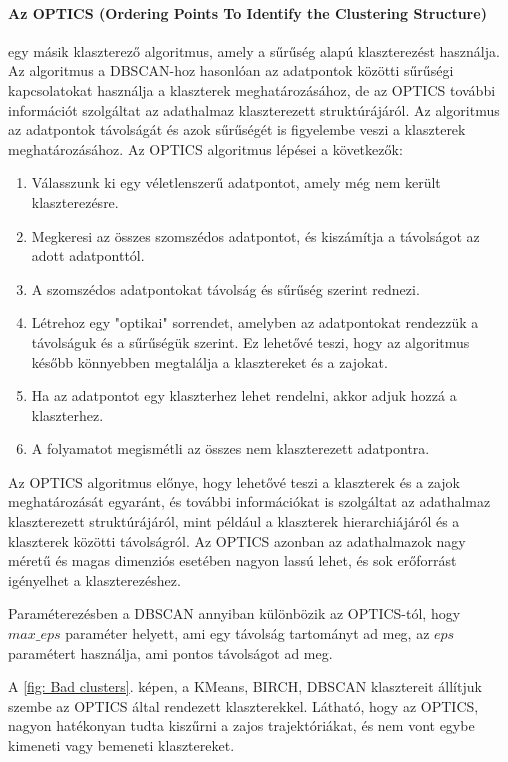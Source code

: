 \documentclass[acmtog, authorversion]{acmart}
\begin{document}
\paragraph{Az OPTICS (Ordering Points To Identify the Clustering Structure)} egy másik klaszterező algoritmus, amely a sűrűség alapú klaszterezést használja. Az algoritmus a DBSCAN-hoz hasonlóan az adatpontok közötti sűrűségi kapcsolatokat használja a klaszterek meghatározásához, de az OPTICS további információt szolgáltat az adathalmaz klaszterezett struktúrájáról. Az algoritmus az adatpontok távolságát és azok sűrűségét is figyelembe veszi a klaszterek meghatározásához.
Az OPTICS algoritmus lépései a következők:
\begin{enumerate}
    \item Válasszunk ki egy véletlenszerű adatpontot, amely még nem került klaszterezésre.
    \item Megkeresi az összes szomszédos adatpontot, és kiszámítja a távolságot az adott adatponttól.
    \item A szomszédos adatpontokat távolság és sűrűség szerint rednezi.
    \item Létrehoz egy "optikai" sorrendet, amelyben az adatpontokat rendezzük a távolságuk és a sűrűségük szerint. Ez lehetővé teszi, hogy az algoritmus később könnyebben megtalálja a klasztereket és a zajokat.
    \item Ha az adatpontot egy klaszterhez lehet rendelni, akkor adjuk hozzá a klaszterhez.
    \item A folyamatot megismétli az összes nem klaszterezett adatpontra.
\end{enumerate}
Az OPTICS algoritmus előnye, hogy lehetővé teszi a klaszterek és a zajok meghatározását egyaránt, és további információkat is szolgáltat az adathalmaz klaszterezett struktúrájáról, mint például a klaszterek hierarchiájáról és a klaszterek közötti távolságról. Az OPTICS azonban az adathalmazok nagy méretű és magas dimenziós esetében nagyon lassú lehet, és sok erőforrást igényelhet a klaszterezéshez.

Paraméterezésben a DBSCAN annyiban különbözik az OPTICS-tól, hogy $max\_eps$ paraméter helyett, ami egy távolság tartományt ad meg, az $eps$ paramétert használja, ami pontos távolságot ad meg.

A \ref{fig: Bad clusters}. képen, a KMeans, BIRCH, DBSCAN klasztereit állítjuk szembe az OPTICS által rendezett klaszterekkel. Látható, hogy az OPTICS, nagyon hatékonyan tudta kiszűrni a zajos trajektóriákat, és nem vont egybe kimeneti vagy bemeneti klasztereket.
\end{document}
